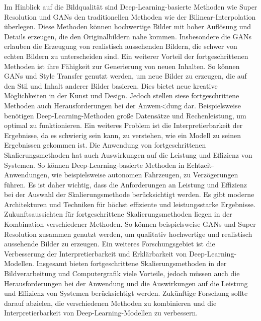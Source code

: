     Im Hinblick auf die Bildqualität sind Deep-Learning-basierte Methoden wie Super Resolution und GANs den traditionellen Methoden wie der Bilinear-Interpolation überlegen.      
    Diese Methoden können hochwertige Bilder mit hoher Auflösung und Details erzeugen, die den Originalbildern nahe kommen.      
    Insbesondere die GANs erlauben die Erzeugung von realistisch aussehenden Bildern, die schwer von echten Bildern zu unterscheiden sind.
    Ein weiterer Vorteil der fortgeschrittenen Methoden ist ihre Fähigkeit zur Generierung von neuen Inhalten.   
    So können GANs und Style Transfer genutzt werden, um neue Bilder zu erzeugen, die auf den Stil und Inhalt anderer Bilder basieren.      
    Dies bietet neue kreative Möglichkeiten in der Kunst und Design.
    Jedoch stellen siese fortgeschrittene Methoden auch Herausforderungen bei der Anwem<dung dar.      
    Beispielsweise benötigen Deep-Learning-Methoden große Datensätze und Rechenleistung, um optimal zu funktionieren.      
    Ein weiteres Problem ist die Interpretierbarkeit der Ergebnisse, da es schwierig sein kann, zu verstehen, wie ein Modell zu seinen Ergebnissen gekommen ist.
    Die Anwendung von fortgeschrittenen Skalierungsmethoden hat auch Auswirkungen auf die Leistung und Effizienz von Systemen.      
    So können Deep-Learning-basierte Methoden in Echtzeit-Anwendungen, wie beispielsweise autonomen Fahrzeugen, zu Verzögerungen führen.      
    Es ist daher wichtig, dass die Anforderungen an Leistung und Effizienz bei der Auswahl der Skalierungsmethode berücksichtigt werden.      
    Es gibt moderne Architekturen und Techniken für höchst effiziente und leistungsstarke Ergebnisse.
    Zukunftsaussichten für fortgeschrittene Skalierungsmethoden liegen in der Kombination verschiedener Methoden. 
    So können beispielsweise GANs und Super Resolution zusammen genutzt werden, um qualitativ hochwertige und realistisch aussehende Bilder zu erzeugen.      
    Ein weiteres Forschungsgebiet ist die Verbesserung der Interpretierbarkeit und Erklärbarkeit von Deep-Learning-Modellen.      
    Insgesamt bieten fortgeschrittene Skalierungsmethoden in der Bildverarbeitung und Computergrafik viele Vorteile, jedoch müssen auch die Herausforderungen bei der Anwendung und die Auswirkungen auf die Leistung und Effizienz von Systemen berücksichtigt werden.      
    Zukünftige Forschung sollte darauf abzielen, die verschiedenen Methoden zu kombinieren und die Interpretierbarkeit von Deep-Learning-Modellen zu verbessern.

\newpage